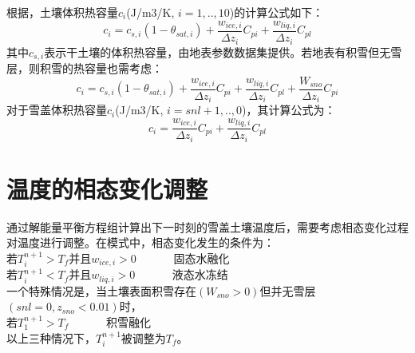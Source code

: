 根据\citet{de1963thermal}，土壤体积热容量$c_i$(J/m3/K, $i=1,..,10$)的计算公式如下：
\begin{equation}
c_{i}=c_{s, i}\left(1-\theta_{sat, i}\right)+\frac{w_{ice, i}}{\Delta z_{i}} C_{pi}+\frac{w_{liq, i}}{\Delta z_{i}} C_{p l}
\end{equation}
其中$c_{s,i}$表示干土壤的体积热容量，由地表参数数据集提供。若地表有积雪但无雪层，则积雪的热容量也需考虑：
\begin{equation}
c_{i}=c_{s,i}\left(1-\theta_{sat, i}\right)+\frac{w_{ice, i}}{\Delta z_{i}} C_{pi}+\frac{w_{liq,i}}{\Delta z_{i}} C_{pl}+\frac{W_{sno}}{\Delta z_{i}} C_{pi}
\end{equation}
对于雪盖体积热容量$c_i$(J/m3/K, $i=snl+1,..,0$)，其计算公式为：
\begin{equation}
c_{i}=\frac{w_{ice, i}}{\Delta z_{i}} C_{pi}+\frac{w_{liq, i}}{\Delta z_{i}} C_{pl}
\end{equation}
\section{温度的相态变化调整}
通过解能量平衡方程组计算出下一时刻的雪盖土壤温度后，需要考虑相态变化过程对温度进行调整。在模式中，相态变化发生的条件为：\\
若$T_i^{n+1}>T_f$并且$w_{ice,i}>0$ \ \   \ \  \ \   固态水融化\\
若$T_i^{n+1}<T_f$并且$w_{liq,i}>0$  \ \   \ \  \ \         液态水冻结\\
一个特殊情况是，当土壤表面积雪存在$\left(W_{sno}>0\right)$但并无雪层$\left(snl=0,z_{sno}<0.01\right)$时，\\
若$T_1^{n+1}>T_f$      \ \   \ \  \ \                 积雪融化\\
以上三种情况下，$T_i^{n+1}$被调整为$T_f$。



